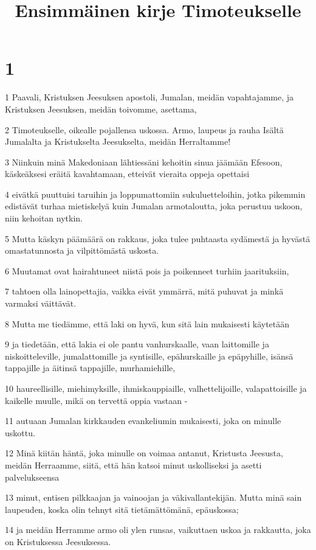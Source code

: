 

\title{Ensimmäinen kirje Timoteukselle}


\chapter{1}

\par 1 Paavali, Kristuksen Jeesuksen apostoli, Jumalan, meidän vapahtajamme, ja Kristuksen Jeesuksen, meidän toivomme, asettama,
\par 2 Timoteukselle, oikealle pojallensa uskossa. Armo, laupeus ja rauha Isältä Jumalalta ja Kristukselta Jeesukselta, meidän Herraltamme!
\par 3 Niinkuin minä Makedoniaan lähtiessäni kehoitin sinua jäämään Efesoon, käskeäksesi eräitä kavahtamaan, etteivät vieraita oppeja opettaisi
\par 4 eivätkä puuttuisi taruihin ja loppumattomiin sukuluetteloihin, jotka pikemmin edistävät turhaa mietiskelyä kuin Jumalan armotaloutta, joka perustuu uskoon, niin kehoitan nytkin.
\par 5 Mutta käskyn päämäärä on rakkaus, joka tulee puhtaasta sydämestä ja hyvästä omastatunnosta ja vilpittömästä uskosta.
\par 6 Muutamat ovat hairahtuneet niistä pois ja poikenneet turhiin jaarituksiin,
\par 7 tahtoen olla lainopettajia, vaikka eivät ymmärrä, mitä puhuvat ja minkä varmaksi väittävät.
\par 8 Mutta me tiedämme, että laki on hyvä, kun sitä lain mukaisesti käytetään
\par 9 ja tiedetään, että lakia ei ole pantu vanhurskaalle, vaan laittomille ja niskoitteleville, jumalattomille ja syntisille, epähurskaille ja epäpyhille, isänsä tappajille ja äitinsä tappajille, murhamiehille,
\par 10 haureellisille, miehimyksille, ihmiskauppiaille, valhettelijoille, valapattoisille ja kaikelle muulle, mikä on tervettä oppia vastaan -
\par 11 autuaan Jumalan kirkkauden evankeliumin mukaisesti, joka on minulle uskottu.
\par 12 Minä kiitän häntä, joka minulle on voimaa antanut, Kristusta Jeesusta, meidän Herraamme, siitä, että hän katsoi minut uskolliseksi ja asetti palvelukseensa
\par 13 minut, entisen pilkkaajan ja vainoojan ja väkivallantekijän. Mutta minä sain laupeuden, koska olin tehnyt sitä tietämättömänä, epäuskossa;
\par 14 ja meidän Herramme armo oli ylen runsas, vaikuttaen uskoa ja rakkautta, joka on Kristuksessa Jeesuksessa.
